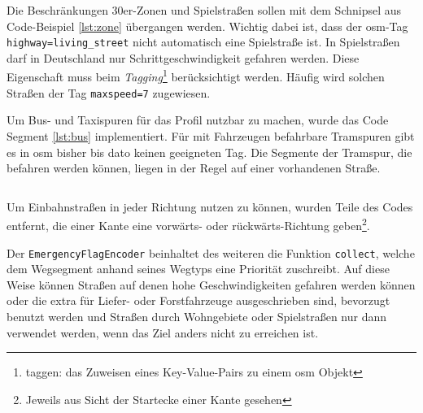 \begin{listing}[htb]
\centering
{}
\inputminted[gobble=2, fontsize=\footnotesize, breaklines, breakbytoken=|, firstline=169, lastline=199]{java}{../data/JavaFiles/EmergencyFlagEncoder.java}
\caption{Definition von Maximalgeschwindigkeiten für unterschiedliche Wegtypen}
\label{lst:flag}
\end{listing}

Die Beschränkungen 30er-Zonen und Spielstraßen sollen mit dem Schnipsel aus Code-Beispiel \ref{lst:zone} übergangen werden.
Wichtig dabei ist, dass der \gls{osm}-Tag \texttt{highway=living\_street} nicht automatisch eine Spielstraße ist.
In Spielstraßen darf in Deutschland nur Schrittgeschwindigkeit gefahren werden.
Diese Eigenschaft muss beim \textit{Tagging}\footnote{taggen: das Zuweisen eines Key-Value-Pairs zu einem \gls{osm} Objekt} berücksichtigt werden.
Häufig wird solchen Straßen der Tag \texttt{maxspeed=7} zugewiesen.


Um Bus- und Taxispuren für das Profil nutzbar zu machen, wurde das Code Segment \ref{lst:bus} implementiert.
Für mit Fahrzeugen befahrbare Tramspuren gibt es in \gls{osm} bisher bis dato keinen geeigneten Tag.
Die Segmente der Tramspur, die befahren werden können, liegen in der Regel auf einer vorhandenen Straße.
\begin{listing}[htb]
\centering
{}
\inputminted[gobble=2, fontsize=\footnotesize, breaklines=true, breakbytoken=|, firstline=299, lastline=303]{java}{../data/JavaFiles/EmergencyFlagEncoder.java}
\caption{Limit für 30er-Zonen und Spielstraßen}
\label{lst:zone}
\end{listing}

Um Einbahnstraßen in jeder Richtung nutzen zu können, wurden Teile des Codes entfernt, die einer Kante eine vorwärts- oder rückwärts-Richtung geben\footnote{Jeweils aus Sicht der Startecke einer Kante gesehen}.

Der \texttt{EmergencyFlagEncoder} beinhaltet des weiteren die Funktion \texttt{collect}, welche dem Wegsegment anhand seines Wegtyps eine Priorität zuschreibt.
Auf diese Weise können Straßen auf denen hohe Geschwindigkeiten gefahren werden können oder die extra für Liefer- oder Forstfahrzeuge ausgeschrieben sind, bevorzugt benutzt werden und Straßen durch Wohngebiete oder Spielstraßen nur dann verwendet werden, wenn das Ziel anders nicht zu erreichen ist.


